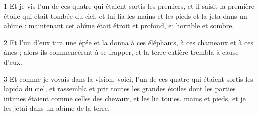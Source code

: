 \par 1 Et je vis l'un de ces quatre qui étaient sortis les premiers, et il saisit la première étoile qui était tombée du ciel, et lui lia les mains et les pieds et la jeta dans un abîme : maintenant cet abîme était étroit et profond, et horrible et sombre.
\par 2 Et l'un d'eux tira une épée et la donna à ces éléphants, à ces chameaux et à ces ânes ; alors ils commencèrent à se frapper, et la terre entière trembla à cause d'eux.
\par 3 Et comme je voyais dans la vision, voici, l'un de ces quatre qui étaient sortis les lapida du ciel, et rassembla et prit toutes les grandes étoiles dont les parties intimes étaient comme celles des chevaux, et les lia toutes. mains et pieds, et je les jetai dans un abîme de la terre.


